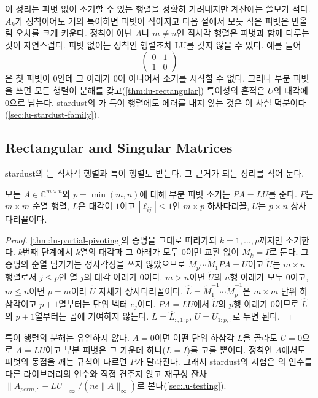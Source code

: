 이 정리는 피벗 없이 소거할 수 있는 행렬을 정확히 가려내지만 계산에는 쓸모가 적다. $A_k$가 정칙이어도 거의 특이하면 피벗이 작아지고 다음 절에서 보듯 작은 피벗은 반올림 오차를 크게 키운다. 정칙이 아닌 $A$나 $m\ne n$인 직사각 행렬은 피벗과 함께 다루는 것이 자연스럽다. 피벗 없이는 정칙인 행렬조차 LU를 갖지 않을 수 있다. 예를 들어
\[
\begin{pmatrix}0&1\\1&0\end{pmatrix}
\]
은 첫 피벗이 $0$인데 그 아래가 $0$이 아니어서 소거를 시작할 수 없다. 그러나 부분 피벗을 쓰면 모든 행렬이 분해를 갖고(\cref{thm:lu-rectangular}) 특이성의 흔적은 $U$의 대각에 $0$으로 남는다. stardust의 가 특이 행렬에도 에러를 내지 않는 것은 이 사실 덕분이다(\cref{sec:lu-stardust-family}).

\subsection{Rectangular and Singular Matrices}

stardust의 는 직사각 행렬과 특이 행렬도 받는다. 그 근거가 되는 정리를 적어 둔다.

\begin{theorem}
\label{thm:lu-rectangular}
모든 $A\in\mathbb C^{m\times n}$와 $p=\min(m,n)$에 대해 부분 피벗 소거는 $PA=LU$를 준다. $P$는 $m\times m$ 순열 행렬, $L$은 대각이 $1$이고 $|\ell_{ij}|\le1$인 $m\times p$ 하사다리꼴, $U$는 $p\times n$ 상사다리꼴이다.
\end{theorem}

\begin{proof}
\cref{thm:lu-partial-pivoting}의 증명을 그대로 따라가되 $k=1,\dots,p$까지만 소거한다. $k$번째 단계에서 $k$열의 대각과 그 아래가 모두 $0$이면 교환 없이 $M_k=I$로 둔다. 그 증명의 순열 넘기기는 정사각성을 쓰지 않았으므로 $\tilde M_p\cdots\tilde M_1PA=\tilde U$이고 $\tilde U$는 $m\times n$ 행렬로서 $j\le p$인 열 $j$의 대각 아래가 $0$이다. $m>n$이면 $\tilde U$의 $n$행 아래가 모두 $0$이고, $m\le n$이면 $p=m$이라 $\tilde U$ 자체가 상사다리꼴이다. $\hat L=\tilde M_1^{-1}\cdots\tilde M_p^{-1}$은 $m\times m$ 단위 하삼각이고 $p+1$열부터는 단위 벡터 $e_j$이다. $PA=\hat L\tilde U$에서 $\tilde U$의 $p$행 아래가 $0$이므로 $\hat L$의 $p+1$열부터는 곱에 기여하지 않는다. $L=\hat L_{:,1:p}$, $U=\tilde U_{1:p,:}$로 두면 된다.
\end{proof}

특이 행렬의 분해는 유일하지 않다. $A=0$이면 어떤 단위 하삼각 $L$을 골라도 $U=0$으로 $A=LU$이고 부분 피벗은 그 가운데 하나($L=I$)를 고를 뿐이다. 정칙인 $A$에서도 피벗의 동점을 깨는 규칙이 다르면 $P$가 달라진다. 그래서 stardust의 시험은 의 인수를 다른 라이브러리의 인수와 직접 견주지 않고 재구성 잔차 $\|A_{\mathit{perm},:}-LU\|_\infty/(n\epsilon\|A\|_\infty)$로 본다(\cref{sec:lu-testing}).

